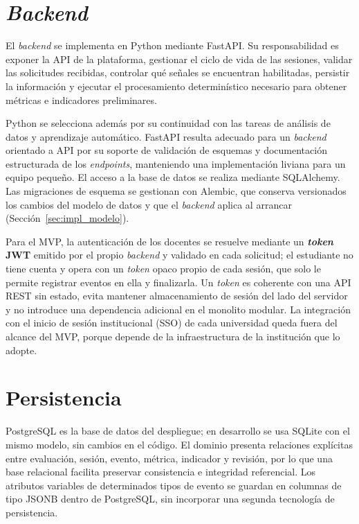 \section{\textit{Backend}}

El \textit{backend} se implementa en Python mediante FastAPI. Su responsabilidad es exponer la API de la plataforma, gestionar el ciclo de vida de las sesiones, validar las solicitudes recibidas, controlar qué señales se encuentran habilitadas, persistir la información y ejecutar el procesamiento determinístico necesario para obtener métricas e indicadores preliminares.

Python se selecciona además por su continuidad con las tareas de análisis de datos y aprendizaje automático. FastAPI resulta adecuado para un \textit{backend} orientado a API por su soporte de validación de esquemas y documentación estructurada de los \textit{endpoints}, manteniendo una implementación liviana para un equipo pequeño. El acceso a la base de datos se realiza mediante SQLAlchemy. Las migraciones de esquema se gestionan con Alembic, que conserva versionados los cambios del modelo de datos y que el \textit{backend} aplica al arrancar (Sección~\ref{sec:impl_modelo}).

Para el MVP, la autenticación de los docentes se resuelve mediante un \textbf{\textit{token} JWT} emitido por el propio \textit{backend} y validado en cada solicitud; el estudiante no tiene cuenta y opera con un \textit{token} opaco propio de cada sesión, que solo le permite registrar eventos en ella y finalizarla. Un \textit{token} es coherente con una API REST sin estado, evita mantener almacenamiento de sesión del lado del servidor y no introduce una dependencia adicional en el monolito modular. La integración con el inicio de sesión institucional (SSO) de cada universidad queda fuera del alcance del MVP, porque depende de la infraestructura de la institución que lo adopte.

\section{Persistencia}
\label{sec:persistencia}

PostgreSQL es la base de datos del despliegue; en desarrollo se usa SQLite con el mismo modelo, sin cambios en el código. El dominio presenta relaciones explícitas entre evaluación, sesión, evento, métrica, indicador y revisión, por lo que una base relacional facilita preservar consistencia e integridad referencial. Los atributos variables de determinados tipos de evento se guardan en columnas de tipo JSONB dentro de PostgreSQL, sin incorporar una segunda tecnología de persistencia.

